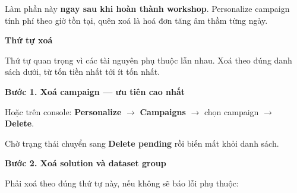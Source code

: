 Làm phần này \textbf{ngay sau khi hoàn thành workshop}. Personalize
campaign tính phí theo giờ tồn tại, quên xoá là hoá đơn tăng âm thầm
từng ngày.

\vspace{0.5em}\noindent\textbf{Thứ tự xoá}\par

Thứ tự quan trọng vì các tài nguyên phụ thuộc lẫn nhau. Xoá theo đúng
danh sách dưới, từ tốn tiền nhất tới ít tốn nhất.

\vspace{0.5em}\noindent\textbf{Bước 1. Xoá campaign --- ưu tiên cao
nhất}\par

\begin{Shaded}
\begin{Highlighting}[]
 \OperatorTok{\textless{}}\OperatorTok{\textgreater{}}
\end{Highlighting}
\end{Shaded}

Hoặc trên console: \textbf{Personalize} \(\rightarrow\)
\textbf{Campaigns} \(\rightarrow\) chọn campaign \(\rightarrow\)
\textbf{Delete}.

Chờ trạng thái chuyển sang \textbf{Delete pending} rồi biến mất khỏi
danh sách.

\vspace{0.5em}\noindent\textbf{Bước 2. Xoá solution và dataset
group}\par

Phải xoá theo đúng thứ tự này, nếu không sẽ báo lỗi phụ thuộc:

\begin{Shaded}
\begin{Highlighting}[]
 \OperatorTok{\textless{}}\OperatorTok{\textgreater{}}

 \OperatorTok{\textless{}}\OperatorTok{\textgreater{}}

 \OperatorTok{\textless{}}\OperatorTok{\textgreater{}}
\end{Highlighting}
\end{Shaded}

